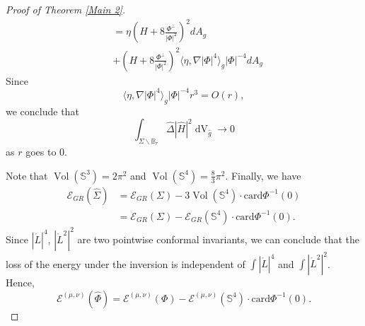 \documentclass[11pt,letterpaper]{amsart}
\DeclareMathOperator{\Vol}{Vol}
\DeclareMathOperator{\dvol}{dV}
\newcommand{\mE}{\mathcal{E}}
\theoremstyle{definition}
\theoremstyle{remark}
\numberwithin{equation}{section}
\begin{document}
\begin{proof}[Proof of Theorem \ref{Main 2}]
\begin{equation*}
\begin{split}
   &= \eta \left(H+8\frac{\Phi^{\perp}}{|\Phi|^2}\right)^2 dA_g\\
    &+\left(H+8\frac{\Phi^{\perp}}{|\Phi|^2}\right)^2\langle \eta, \nabla |\Phi|^4\rangle_g |\Phi|^{-4}dA_g 
    \end{split}
\end{equation*}
Since 
\begin{equation*}
    \langle \eta, \nabla |\Phi|^4\rangle_g |\Phi|^{-4}r^3=O(r),
\end{equation*}
we conclude that 
\begin{equation*}
    \int_{\Sigma \backslash \mathbb{B}_r}\hat{\Delta}|\hat{H}|^2 \dvol_{\hat{g}}\to 0
\end{equation*}
as $r$ goes to $0$.

Note that $\Vol(\mathbb{S}^3)=2\pi^2$ and $\Vol(\mathbb{S}^4)=\frac{8}{3}\pi^2$. Finally, we have
\begin{equation*}
\begin{split}
    \mE_{GR}(\hat{\Sigma})&=\mE_{GR}(\Sigma)-3\Vol(\mathbb{S}^4)\cdot \mathrm{card} \Phi^{-1}(0)\\
    &=\mE_{GR}(\Sigma)-\mE_{GR}(\mathbb{S}^4)\cdot \mathrm{card} \Phi^{-1}(0).
    \end{split}
\end{equation*}
Since $|\mathring{L}|^4$, $|\mathring{L}^2|^2$ are two pointwise conformal invariants, we can conclude that the loss of the energy under the inversion is independent of $\int |\mathring{L}|^4$ and $\int |\mathring{L}^2|^2$. Hence,
\begin{equation*}
    \mE^{(\mu, \nu)}(\hat{\Phi})=\mE^{(\mu, \nu)}(\Phi)-\mE^{(\mu, \nu)}(\mathbb{S}^4)\cdot \mathrm{card} \Phi^{-1}(0).
\end{equation*}
\end{proof}
\end{document}
